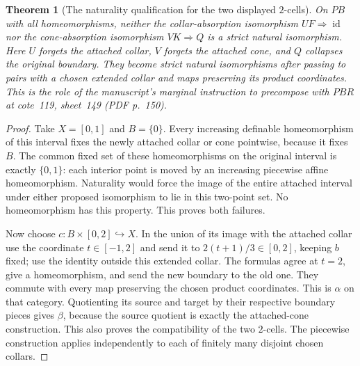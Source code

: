 \documentclass[11pt,a4paper]{article}
\newtheorem{theorem}{Theorem}[section]
\theoremstyle{definition}
\DeclareMathOperator{\id}{id}
\begin{document}
\begin{theorem}[The naturality qualification for the two displayed $2$-cells]\label{result-11}
On $PB$ with all homeomorphisms, neither the collar-absorption
isomorphism $UF\Rightarrow\id$ nor the cone-absorption isomorphism
$VK\Rightarrow Q$ is a strict natural isomorphism. Here $U$ forgets
the attached collar, $V$ forgets the attached cone, and $Q$ collapses
the original boundary. They become strict natural isomorphisms after
passing to pairs with a chosen extended collar and maps preserving its
product coordinates. This is the role of the manuscript's marginal
instruction to precompose with $PBR$ at cote~119, sheet~149 (PDF p.~150).
\end{theorem}
\begin{proof}
Take $X=[0,1]$ and $B=\{0\}$. Every increasing definable
homeomorphism of this interval fixes the newly attached collar or cone
pointwise, because it fixes $B$. The common fixed set of these
homeomorphisms on the original interval is exactly $\{0,1\}$:
each interior point is moved by an increasing piecewise affine
homeomorphism. Naturality would force the image of the entire attached
interval under either proposed isomorphism to lie in this two-point
set. No homeomorphism has this property. This proves both failures.

Now choose $c:B\times[0,2]\hookrightarrow X$. In the union of its
image with the attached collar use the coordinate $t\in[-1,2]$ and
send it to $2(t+1)/3\in[0,2]$, keeping $b$ fixed; use the identity
outside this extended collar. The formulas agree at $t=2$, give a
homeomorphism, and send the new boundary to the old one. They commute
with every map preserving the chosen product coordinates. This is
$\alpha$ on that category. Quotienting its source and target by their
respective boundary pieces gives $\beta$, because the source quotient
is exactly the attached-cone construction. This also proves the
compatibility of the two $2$-cells. The piecewise construction applies
independently to each of finitely many disjoint chosen collars.
\end{proof}
\end{document}

